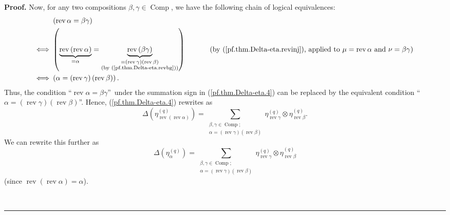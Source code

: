 \documentclass[numbers=enddot,12pt,final,onecolumn,notitlepage]{scrartcl}%
\theoremstyle{definition}
\newenvironment{proof}[1][Proof]{\noindent\textbf{#1.} }{\ \rule{0.5em}{0.5em}}
\let\sumnonlimits\sum
\renewcommand{\sum}{\sumnonlimits\limits}
\newenvironment{verlong}{}{}
\begin{document}
\begin{verlong}
\begin{proof}
Now, for any two compositions $\beta,\gamma\in\operatorname*{Comp}$, we have
the following chain of logical equivalences:%
\begin{align*}
&  \ \left(  \operatorname*{rev}\alpha=\beta\gamma\right) \\
\Longleftrightarrow &  \ \left(  \underbrace{\operatorname*{rev}\left(
\operatorname*{rev}\alpha\right)  }_{=\alpha}=\underbrace{\operatorname*{rev}%
\left(  \beta\gamma\right)  }_{\substack{=\left(  \operatorname*{rev}%
\gamma\right)  \left(  \operatorname*{rev}\beta\right)  \\\text{(by
(\ref{pf.thm.Delta-eta.revbg}))}}}\right)  \ \ \ \ \ \ \ \ \ \ \left(
\text{by (\ref{pf.thm.Delta-eta.revinj}), applied to }\mu=\operatorname*{rev}%
\alpha\text{ and }\nu=\beta\gamma\right) \\
\Longleftrightarrow &  \ \left(  \alpha=\left(  \operatorname*{rev}%
\gamma\right)  \left(  \operatorname*{rev}\beta\right)  \right)  .
\end{align*}
Thus, the condition \textquotedblleft$\operatorname*{rev}\alpha=\beta\gamma
$\textquotedblright\ under the summation sign in (\ref{pf.thm.Delta-eta.4})
can be replaced by the equivalent condition \textquotedblleft$\alpha=\left(
\operatorname*{rev}\gamma\right)  \left(  \operatorname*{rev}\beta\right)
$\textquotedblright. Hence, (\ref{pf.thm.Delta-eta.4}) rewrites as
\[
\Delta\left(  \eta_{\operatorname*{rev}\left(  \operatorname*{rev}%
\alpha\right)  }^{\left(  q\right)  }\right)  =\sum_{\substack{\beta,\gamma
\in\operatorname*{Comp};\\\alpha=\left(  \operatorname*{rev}\gamma\right)
\left(  \operatorname*{rev}\beta\right)  }}\eta_{\operatorname*{rev}\gamma
}^{\left(  q\right)  }\otimes\eta_{\operatorname*{rev}\beta}^{\left(
q\right)  }.
\]
We can rewrite this further as%
\begin{equation}
\Delta\left(  \eta_{\alpha}^{\left(  q\right)  }\right)  =\sum
_{\substack{\beta,\gamma\in\operatorname*{Comp};\\\alpha=\left(
\operatorname*{rev}\gamma\right)  \left(  \operatorname*{rev}\beta\right)
}}\eta_{\operatorname*{rev}\gamma}^{\left(  q\right)  }\otimes\eta
_{\operatorname*{rev}\beta}^{\left(  q\right)  } \label{pf.thm.Delta-eta.9}%
\end{equation}
(since $\operatorname*{rev}\left(  \operatorname*{rev}\alpha\right)  =\alpha$).


\end{proof}
\end{verlong}
\end{document}
